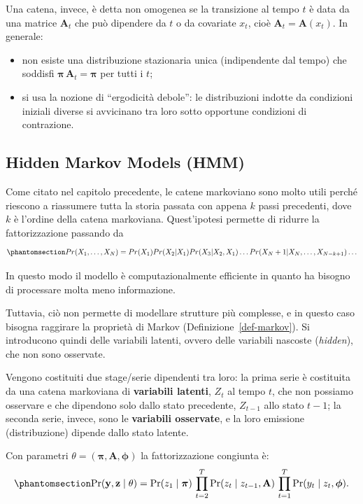 \documentclass[
  italian,
  a4paper,
  a4paper,
  twoside,
  open=right,
  12pt]{scrbook}
\theoremstyle{definition}
\theoremstyle{remark}
\begin{document}
Una catena, invece, è detta non omogenea se la transizione al tempo
\(t\) è data da una matrice \(\mathbf{A}_t\) che può dipendere da \(t\)
o da covariate \(x_t\), cioè \(\mathbf{A}_t=\mathbf{A}(x_t)\). In
generale:

\begin{itemize}
\item
  non esiste una distribuzione stazionaria unica (indipendente dal
  tempo) che soddisfi
  \(\boldsymbol{\pi}\,\mathbf{A}_t=\boldsymbol{\pi}\) per tutti i \(t\);
\item
  si usa la nozione di ``ergodicità debole'': le distribuzioni indotte
  da condizioni iniziali diverse si avvicinano tra loro sotto opportune
  condizioni di contrazione.
\end{itemize}

\subsection{Hidden Markov Models (HMM)}\label{hidden-markov-models-hmm}

Come citato nel capitolo precedente, le catene markoviano sono molto
utili perché riescono a riassumere tutta la storia passata con appena
\(k\) passi precedenti, dove \(k\) è l'ordine della catena markoviana.
Quest'ipotesi permette di ridurre la fattorizzazione passando da
\begin{equation}\phantomsection\label{eq-markov_k}{
Pr(X_1, \dots, X_N) = Pr(X_1)Pr(X_2|X_1)Pr(X_3|X_2,X_1)\dots Pr(X_N+1|X_N,\dots, X_{N-k+1})\dots
}\end{equation}

In questo modo il modello è computazionalmente efficiente in quanto ha
bisogno di processare molta meno informazione.

Tuttavia, ciò non permette di modellare strutture più complesse, e in
questo caso bisogna raggirare la proprietà di Markov
(Definizione~\ref{def-markov}). Si introducono quindi delle variabili
latenti, ovvero delle variabili nascoste (\emph{hidden}), che non sono
osservate.

Vengono costituiti due stage/serie dipendenti tra loro: la prima serie è
costituita da una catena markoviana di \textbf{variabili latenti},
\(Z_t\) al tempo \(t\), che non possiamo osservare e che dipendono solo
dallo stato precedente, \(Z_{t-1}\) allo stato \(t-1\); la seconda
serie, invece, sono le \textbf{variabili osservate}, e la loro emissione
(distribuzione) dipende dallo stato latente.

Con parametri
\(\theta = (\boldsymbol{\pi}, \mathbf{A}, \boldsymbol{\phi})\) la
fattorizzazione congiunta è:
\begin{equation}\phantomsection\label{eq-hmm}{
\Pr(\mathbf{y}, \mathbf{z} \mid \theta)
= \Pr(z_1 \mid \boldsymbol{\pi}) \,\prod_{t=2}^{T} \Pr(z_t \mid z_{t-1}, \mathbf{A}) \,\prod_{t=1}^{T} \Pr(y_t \mid z_t, \boldsymbol{\phi}).
}\end{equation}
\end{document}
